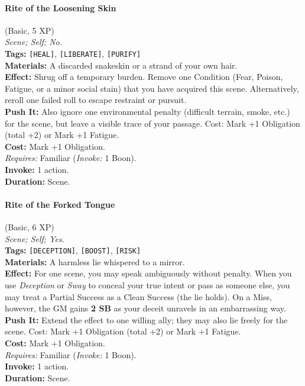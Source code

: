 \paragraph{Rite of the Loosening Skin} (Basic, 5 XP) \hfill \\
\emph{Scene; Self; No.} \\
\textbf{Tags:} \texttt{[HEAL]}, \texttt{[LIBERATE]}, \texttt{[PURIFY]} \\
\textbf{Materials:} A discarded snakeskin or a strand of your own hair. \\
\textbf{Effect:} Shrug off a temporary burden. Remove one Condition (Fear, Poison, Fatigue, or a minor social stain) that you have acquired this scene. Alternatively, reroll one failed roll to escape restraint or pursuit. \\
\textbf{Push It:} Also ignore one environmental penalty (difficult terrain, smoke, etc.) for the scene, but leave a visible trace of your passage. Cost: Mark +1 Obligation (total +2) or Mark +1 Fatigue. \\
\textbf{Cost:} Mark +1 Obligation. \\
\textit{Requires:} Familiar (\textit{Invoke:} 1 Boon). \\
\textbf{Invoke:} 1 action. \\
\textbf{Duration:} Scene.

\paragraph{Rite of the Forked Tongue} (Basic, 6 XP) \hfill \\
\emph{Scene; Self; Yes.} \\
\textbf{Tags:} \texttt{[DECEPTION]}, \texttt{[BOOST]}, \texttt{[RISK]} \\
\textbf{Materials:} A harmless lie whispered to a mirror. \\
\textbf{Effect:} For one scene, you may speak ambiguously without penalty. When you use \textit{Deception} or \textit{Sway} to conceal your true intent or pass as someone else, you may treat a Partial Success as a Clean Success (the lie holds). On a Miss, however, the GM gains \textbf{2 SB} as your deceit unravels in an embarrassing way. \\
\textbf{Push It:} Extend the effect to one willing ally; they may also lie freely for the scene. Cost: Mark +1 Obligation (total +2) or Mark +1 Fatigue. \\
\textbf{Cost:} Mark +1 Obligation. \\
\textit{Requires:} Familiar (\textit{Invoke:} 1 Boon). \\
\textbf{Invoke:} 1 action. \\
\textbf{Duration:} Scene.


